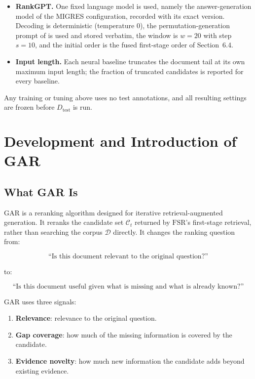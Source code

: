 \documentclass[11pt,a4paper]{article}
\begin{document}
\begin{itemize}[leftmargin=1.5em]
\[
S_{\mathrm{MonoT5-G}}(d)=\max\left(S_{\mathrm{MonoT5}}(q,d),\max_i S_{\mathrm{MonoT5}}(g_i,d)\right).
\]
This isolates the effect of giving a strong pointwise reranker access to the same gap information available to GAR; it uses no GAR coverage or novelty term.
\item \textbf{RankGPT.} One fixed language model is used, namely the answer-generation model of the MIGRES configuration, recorded with its exact version. Decoding is deterministic (temperature $0$), the permutation-generation prompt of \citet{sun-etal-2023-chatgpt} is used and stored verbatim, the window is $w=20$ with step $s=10$, and the initial order is the fused first-stage order of Section~6.4.
\item \textbf{Input length.} Each neural baseline truncates the document tail at its own maximum input length; the fraction of truncated candidates is reported for every baseline.
\end{itemize}

Any training or tuning above uses no test annotations, and all resulting settings are frozen before $D_{\mathrm{test}}$ is run.

\section{Development and Introduction of GAR}

\subsection{What GAR Is}

GAR is a reranking algorithm designed for iterative retrieval-augmented generation. It reranks the candidate set $\mathcal{C}_t$ returned by $\mathrm{FSR}$'s first-stage retrieval, rather than searching the corpus $\mathcal{D}$ directly. It changes the ranking question from:

\[
\text{``Is this document relevant to the original question?''}
\]

to:

\[
\text{``Is this document useful given what is missing and what is already known?''}
\]

GAR uses three signals:

\begin{enumerate}[leftmargin=1.5em]
\item \textbf{Relevance}: relevance to the original question.
\item \textbf{Gap coverage}: how much of the missing information is covered by the candidate.
\item \textbf{Evidence novelty}: how much new information the candidate adds beyond existing evidence.
\end{enumerate}
\end{document}
